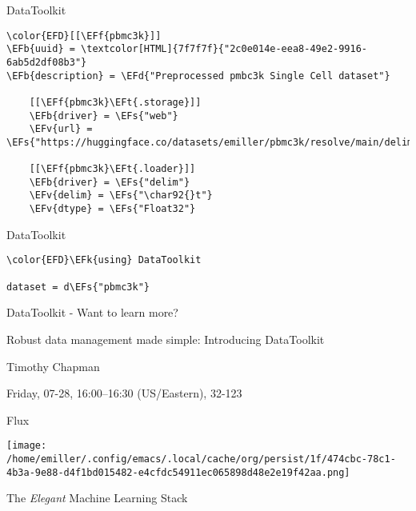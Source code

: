 \documentclass[bigger]{beamer}
\newcommand{\EFs}[1]{\textcolor{EFs}{#1}} %
\newcommand{\EFd}[1]{\textcolor{EFd}{\textit{#1}}} %
\newcommand{\EFk}[1]{\textcolor{EFk}{#1}} %
\newcommand{\EFb}[1]{\textcolor{EFb}{#1}} %
\newcommand{\EFf}[1]{\textcolor{EFf}{#1}} %
\newcommand{\EFv}[1]{\textcolor{EFv}{#1}} %
\newcommand{\EFt}[1]{\textcolor{EFt}{#1}} %
\begin{document}
\begin{frame}[label={sec:org5fe232a},fragile]{DataToolkit}
 \begin{Code}
\begin{Verbatim}
\color{EFD}[[\EFf{pbmc3k}]]
\EFb{uuid} = \textcolor[HTML]{7f7f7f}{"2c0e014e-eea8-49e2-9916-6ab5d2df08b3"}
\EFb{description} = \EFd{"Preprocessed pmbc3k Single Cell dataset"}

    [[\EFf{pbmc3k}\EFt{.storage}]]
    \EFb{driver} = \EFs{"web"}
    \EFv{url} = \EFs{"https://huggingface.co/datasets/emiller/pbmc3k/resolve/main/delim\_file.txt"}

    [[\EFf{pbmc3k}\EFt{.loader}]]
    \EFb{driver} = \EFs{"delim"}
    \EFv{delim} = \EFs{"\char92{}t"}
    \EFv{dtype} = \EFs{"Float32"}
\end{Verbatim}
\end{Code}
\end{frame}

\begin{frame}[label={sec:org871420c},fragile]{DataToolkit}
 \begin{Code}
\begin{Verbatim}
\color{EFD}\EFk{using} DataToolkit

dataset = d\EFs{"pbmc3k"}
\end{Verbatim}
\end{Code}
\end{frame}

\begin{frame}[label={sec:org6607910}]{DataToolkit - Want to learn more?}
\begin{center}

\end{center}

Robust data management made simple: Introducing DataToolkit

Timothy Chapman

Friday, 07-28, 16:00–16:30 (US/Eastern), 32-123
\end{frame}
\begin{frame}[label={sec:org9aeedc3}]{Flux}
\begin{center}
\texttt{[image: /home/emiller/.config/emacs/.local/cache/org/persist/1f/474cbc-78c1-4b3a-9e88-d4f1bd015482-e4cfdc54911ec065898d48e2e19f42aa.png]}
\end{center}
\begin{center}
The \emph{Elegant} Machine Learning Stack
\end{center}
\end{frame}
\end{document}
